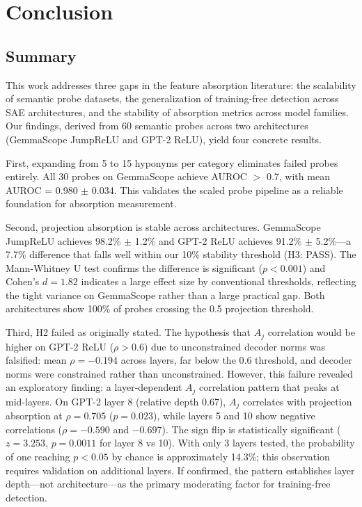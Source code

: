 \documentclass{article}
\begin{document}
\section{Conclusion}
\label{sec:conclusion}

\subsection{Summary}

This work addresses three gaps in the feature absorption literature: the scalability of semantic probe datasets, the generalization of training-free detection across SAE architectures, and the stability of absorption metrics across model families. Our findings, derived from 60 semantic probes across two architectures (GemmaScope JumpReLU and GPT-2 ReLU), yield four concrete results.

First, expanding from 5 to 15 hyponyms per category eliminates failed probes entirely. All 30 probes on GemmaScope achieve AUROC $>$ 0.7, with mean AUROC = 0.980 $\pm$ 0.034. This validates the scaled probe pipeline as a reliable foundation for absorption measurement.

Second, projection absorption is stable across architectures. GemmaScope JumpReLU achieves 98.2\% $\pm$ 1.2\% and GPT-2 ReLU achieves 91.2\% $\pm$ 5.2\%---a 7.7\% difference that falls well within our 10\% stability threshold (H3: PASS). The Mann-Whitney U test confirms the difference is significant ($p < 0.001$) and Cohen's $d = 1.82$ indicates a large effect size by conventional thresholds, reflecting the tight variance on GemmaScope rather than a large practical gap. Both architectures show 100\% of probes crossing the 0.5 projection threshold.

Third, H2 failed as originally stated. The hypothesis that $A_j$ correlation would be higher on GPT-2 ReLU ($\rho > 0.6$) due to unconstrained decoder norms was falsified: mean $\rho = -0.194$ across layers, far below the 0.6 threshold, and decoder norms were constrained rather than unconstrained. However, this failure revealed an exploratory finding: a layer-dependent $A_j$ correlation pattern that peaks at mid-layers. On GPT-2 layer 8 (relative depth 0.67), $A_j$ correlates with projection absorption at $\rho = 0.705$ ($p = 0.023$), while layers 5 and 10 show negative correlations ($\rho = -0.590$ and $-0.697$). The sign flip is statistically significant ($z = 3.253$, $p = 0.0011$ for layer 8 vs 10). With only 3 layers tested, the probability of one reaching $p < 0.05$ by chance is approximately 14.3\%; this observation requires validation on additional layers. If confirmed, the pattern establishes layer depth---not architecture---as the primary moderating factor for training-free detection.
\end{document}
